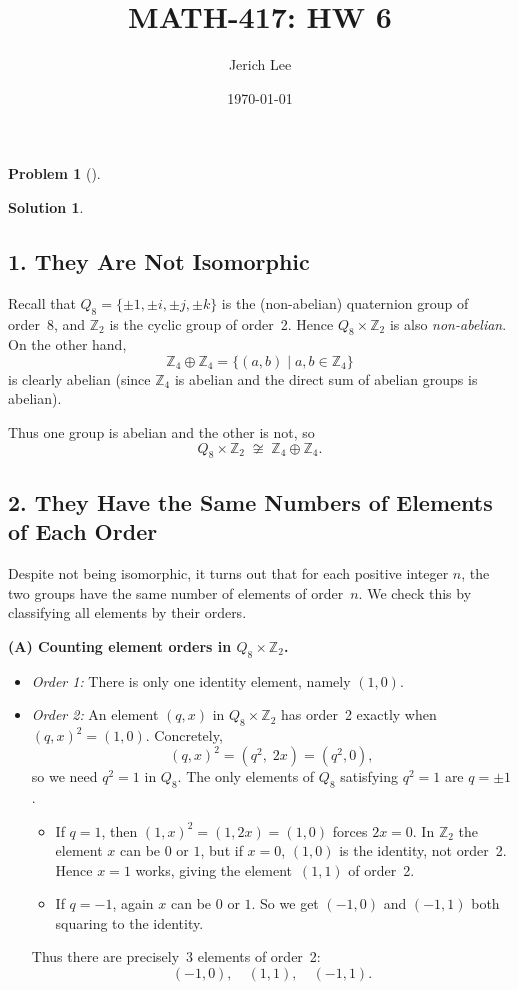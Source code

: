 \documentclass[12pt]{article}
\title{MATH-417: HW 6}
\author{Jerich Lee}
\date{\today}
\theoremstyle{definition} %
\newtheorem{solution}{Solution}
\newtheorem{problem}{Problem}
\theoremstyle{plain} %
\begin{document}
\maketitle
\begin{problem}[]
    
\end{problem}
\begin{solution}
    \subsection*{1.  They Are Not Isomorphic}

Recall that \(Q_8=\{\pm 1,\pm i,\pm j,\pm k\}\) is the (non-abelian) quaternion 
group of order~8, and \(\mathbb{Z}_2\) is the cyclic group of order~2.
Hence \(Q_8\times \mathbb{Z}_2\) is also \emph{non-abelian}.  
On the other hand, 
\[
\mathbb{Z}_4\oplus \mathbb{Z}_4 = \{(a,b)\mid a,b\in \mathbb{Z}_4\}
\]
is clearly abelian (since \(\mathbb{Z}_4\) is abelian and the direct sum 
of abelian groups is abelian).  

Thus one group is abelian and the other is not, so 
\[
Q_8\times \mathbb{Z}_2 \;\not\cong\; 
\mathbb{Z}_4\oplus \mathbb{Z}_4.
\]

\subsection*{2.  They Have the Same Numbers of Elements of Each Order}

Despite not being isomorphic, it turns out that for each positive integer \(n\),
the two groups have the same number of elements of order~\(n\).  We check this 
by classifying all elements by their orders.

\bigskip
\noindent
\textbf{(A) Counting element orders in \(Q_8\times \mathbb{Z}_2\).}

\begin{itemize}
\item 
\emph{Order 1:} 
There is only one identity element, namely \((1,0)\). 

\item 
\emph{Order 2:}
An element \((q,x)\) in \(Q_8\times \mathbb{Z}_2\) has order~2 exactly 
when \((q,x)^2 = (1,0)\).  Concretely, 
\[
(q,x)^2 = (q^2,\;2x) = (q^2,0),
\]
so we need \(q^2=1\) in \(Q_8\).  The only elements of \(Q_8\) 
satisfying \(q^2=1\) are \(q = \pm 1\).  
\begin{itemize}
\item If \(q=1\), then \((1,x)^2=(1,2x)=(1,0)\) forces \(2x=0\). In 
\(\mathbb{Z}_2\) the element \(x\) can be \(0\) or \(1\), 
but if \(x=0\), \((1,0)\) is the identity, not order~2.  
Hence \(x=1\) works, giving the element \(\,(1,1)\) of order~2.
\item If \(q=-1\), again \(x\) can be \(0\) or \(1\).  So we get 
\((-1,0)\) and \((-1,1)\) both squaring to the identity. 
\end{itemize}
Thus there are precisely \(\,3\) elements of order~2: 
\[
(-1,0),\quad (1,1),\quad (-1,1).
\]


\end{itemize}
\end{solution}
\end{document}
